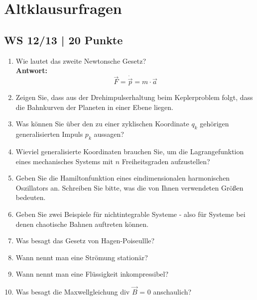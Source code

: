 \section{Altklausurfragen}
\subsection{WS 12/13 | 20 Punkte}
\begin{enumerate}
    \item Wie lautet das zweite Newtonsche Gesetz?\\
        \textbf{Antwort:}\\
        \begin{equation*}
            \vec{F} = \dot{\vec{p}} = m \cdot \vec{a}
        \end{equation*}
    \item Zeigen Sie, dass aus der Drehimpulserhaltung beim Keplerproblem folgt, dass die Bahnkurven der Planeten in einer Ebene liegen.
    \item Was können Sie über den zu einer zyklischen Koordinate $q_k$ gehörigen generalisierten Impuls $p_k$ aussagen?
    \item Wieviel generalisierte Koordinaten brauchen Sie, um die Lagrangefunktion eines mechanisches Systems mit $n$ Freiheitsgraden aufzustellen?
    \item Geben Sie die Hamiltonfunktion eines eindimensionalen harmonischen Oszillators an. Schreiben Sie bitte, was die von Ihnen verwendeten Größen bedeuten.
    \item Geben Sie zwei Beispiele für nichtintegrable Systeme - also für Systeme bei denen chaotische Bahnen auftreten können.
    \item Was besagt das Gesetz von Hagen-Poiseullle?
    \item Wann nennt man eine Strömung stationär?
    \item Wann nennt man eine Flüssigkeit inkompressibel?
    \item Was besagt die Maxwellgleichung div $\vec{B}$ = 0 anschaulich?    
\end{enumerate}
